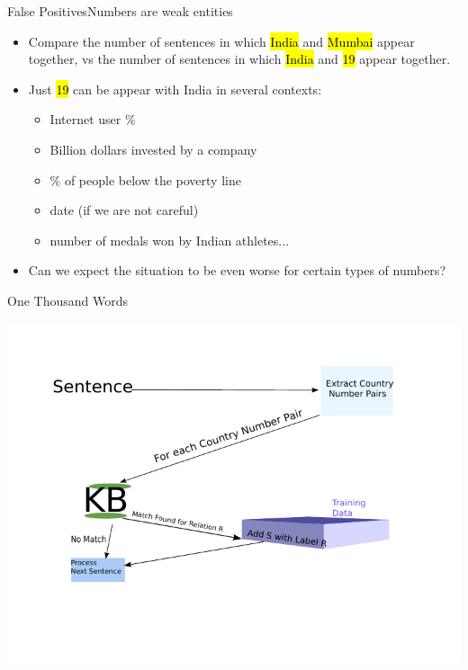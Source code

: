 \documentclass{beamer}
\makeatletter
\newcommand\SoulColor{%
  \let\set@color\beamerorig@set@color
  \let\reset@color\beamerorig@reset@color}
\makeatother
\begin{document}
 \begin{frame}{False Positives}{Numbers are weak entities}
 \begin{itemize}  
 \item Compare the number of sentences in which {\SoulColor\hl{India}} and {\SoulColor\hl{Mumbai}} appear together, vs the number of sentences
  in which {\SoulColor\hl{India}} and {\SoulColor\hl{19}} appear together.
 \item Just {\SoulColor\hl{19}} can be appear with India in several contexts:
 \begin{itemize}
 \item Internet user \%
 \item Billion dollars invested by a company
 \item \% of people below the poverty line
 \item date (if we are not careful)
 \item number of medals won by Indian athletes...
\end{itemize}

 \item Can we expect the situation to be even worse for certain types of numbers?
\end{itemize}
\end{frame}

\begin{frame}{One Thousand Words}
 \begin{center}
 \includegraphics{./imgs/simple.pdf}
\end{center}

\end{frame}
\end{document}
